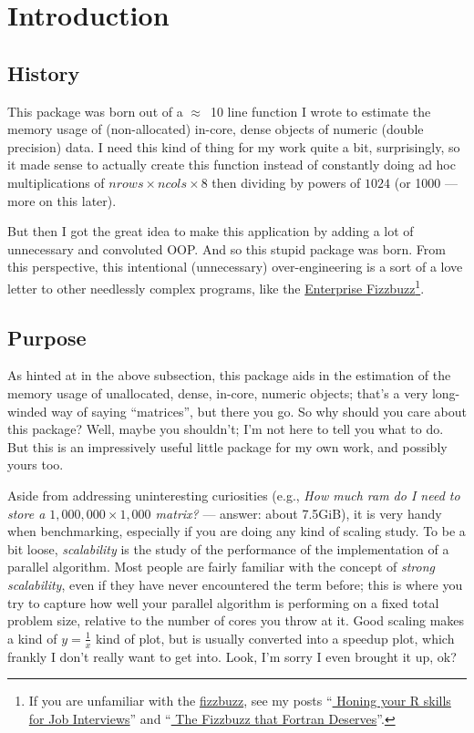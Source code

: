 \section{Introduction}

\subsection{History}

This package was born out of a $\approx$~10 line function I wrote to estimate 
the memory usage of (non-allocated) in-core, dense  objects of 
numeric (double precision) data.  I need this kind of thing for my 
work quite a bit, surprisingly, so it made sense to actually 
create this function instead of constantly doing ad hoc multiplications of 
$nrows\times ncols \times 8$ then dividing by powers of $1024$ (or 1000 --- 
more on this later).

But then I got the great idea to make this application  by adding a lot of unnecessary and convoluted OOP.  And so this 
stupid package was born.  From this perspective, this intentional 
(unnecessary) over-engineering is a sort of a love letter to other needlessly 
complex programs, like the 
\href{https://github.com/Mikkeren/FizzBuzzEnterpriseEdition}{Enterprise 
Fizzbuzz}\footnote{If you are unfamiliar with the 
\href{https://en.wikipedia.org/wiki/Bizz_buzz}{fizzbuzz}, see my posts ``\href{
http://librestats.com/2012/01/10/honing-your-r-skills-for-job-interviews/}{
Honing your R skills for Job Interviews}'' and 
``\href{http://librestats.com/2013/04/26/the-fizzbuzz-that-fortran-deserves/}{
The Fizzbuzz that Fortran Deserves}''.}.


\subsection{Purpose}

As hinted at in the above subsection, this package aids in the estimation of 
the memory usage of unallocated, dense, in-core, numeric objects; that's a 
very long-winded way of saying ``matrices'', but there you go.  So why should 
you care about this package?  Well, maybe you shouldn't; I'm not here to tell 
you what to do.  But this is an impressively useful little package for my own 
work, and possibly yours too. 
  
Aside from addressing uninteresting curiosities (e.g., \emph{How much ram do I 
need to store a $1,000,000\times 1,000$ matrix?} --- answer: about 7.5GiB), it 
is very handy when benchmarking, especially if you are doing any kind of 
scaling study. To be a bit loose, \emph{scalability} is the study of the 
performance of the implementation of a parallel algorithm.   Most people are 
fairly familiar with the concept of \emph{strong scalability}, even if they have 
never encountered the term before; this is where you try to capture how well 
your parallel algorithm is performing on a fixed total problem size, relative to 
the number of cores you throw at it.  Good scaling makes a kind of 
$y=\frac{1}{x}$ kind of plot, but is usually converted into a speedup plot, 
which frankly I don't really want to get into.  Look, I'm sorry I even brought 
it up, ok?

